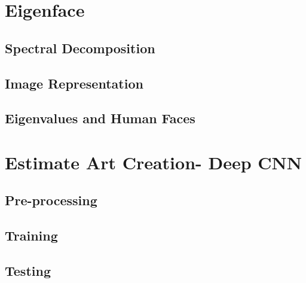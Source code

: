 \documentclass{article}
\begin{document}
\section{Eigenface}
\subsection{Spectral Decomposition}
\subsection{Image Representation}
\subsection{Eigenvalues and Human Faces}

\section{Estimate Art Creation- Deep CNN}
\subsection{Pre-processing}
\subsection{Training}
\subsection{Testing}
\end{document}
